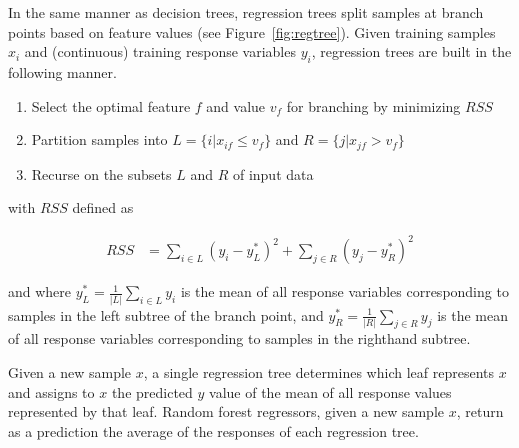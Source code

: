 \documentclass{article} %
\begin{document}
In the same manner as decision trees, regression trees split samples at branch points based on feature values (see Figure~\ref{fig:regtree}). Given training samples $x_i$ and (continuous) training response variables $y_i$, regression trees are built in the following manner.

\begin{enumerate}
  \item Select the optimal feature $f$ and value $v_f$ for branching by minimizing $RSS$
  \item Partition samples into $L = \{i | x_{if} \leq v_f\}$ and $R = \{j | x_{jf} > v_f\}$
  \item Recurse on the subsets $L$ and $R$ of input data
\end{enumerate}

with $RSS$ defined as

\begin{align*}
  RSS &= \sum_{i \in L} (y_i - y_L^*)^2 + \sum_{j \in R} (y_j - y_R^*)^2
\end{align*}

and where $y_L^* = \frac{1}{\lvert L \rvert} \sum_{i \in L} y_i $ is the mean of all response variables corresponding to samples in the left subtree of the branch point, and $y_R^* = \frac{1}{\lvert R \rvert} \sum_{j \in R} y_j$ is the mean of all response variables corresponding to samples in the righthand subtree.

Given a new sample $x$, a single regression tree determines which leaf represents $x$ and assigns to $x$ the predicted $y$ value of the mean of all response values represented by that leaf. Random forest regressors, given a new sample $x$, return as a prediction the average of the responses of each regression tree.



\end{document}
